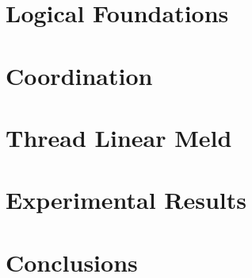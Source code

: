 \documentclass[12pt]{cmuthesis}
\theoremstyle{indented}
\begin{document}
\chapter{Logical Foundations}



\chapter{Coordination}\label{chapter:coordination}


\chapter{Thread Linear Meld}



\chapter{Experimental Results}\label{chapter:exp}


\chapter{Conclusions}


\appendix


\backmatter


\renewcommand{\bibsection}{\chapter{\bibname}}

\end{document}
